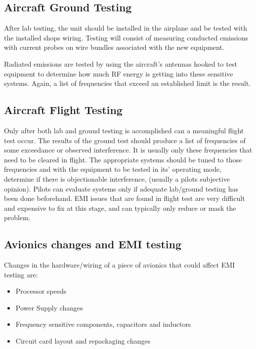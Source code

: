 \documentclass[
]{book}
\providecommand{\tightlist}{%
  \setlength{\itemsep}{0pt}\setlength{\parskip}{0pt}}
\begin{document}
\hypertarget{aircraft-ground-testing}{%
\subsection{Aircraft Ground Testing}\label{aircraft-ground-testing}}

After lab testing, the unit should be installed in the airplane and be tested
with the installed shops wiring. Testing will consist of measuring conducted
emissions with current probes on wire bundles associated with the new equipment.

Radiated emissions are tested by using the aircraft's antennas hooked to test
equipment to determine how much RF energy is getting into these sensitive
systems. Again, a list of frequencies that exceed an established limit is the
result.

\hypertarget{aircraft-flight-testing}{%
\subsection{Aircraft Flight Testing}\label{aircraft-flight-testing}}

Only after both lab and ground testing is accomplished can a meaningful flight
test occur. The results of the ground test should produce a list of frequencies
of some exceedance or observed interference. It is usually only these
frequencies that need to be cleared in flight. The appropriate systems should be
tuned to those frequencies and with the equipment to be tested in its' operating
mode, determine if there is objectionable interference, (usually a pilots
subjective opinion). Pilots can evaluate systems only if adequate lab/ground
testing has been done beforehand. EMI issues that are found in flight test are
very difficult and expensive to fix at this stage, and can typically only reduce
or mask the problem.

\hypertarget{avionics-changes-and-emi-testing}{%
\subsection{Avionics changes and EMI testing}\label{avionics-changes-and-emi-testing}}

Changes in the hardware/wiring of a piece of avionics that could affect EMI
testing are:

\begin{itemize}
\tightlist
\item
  Processor speeds
\item
  Power Supply changes
\item
  Frequency sensitive components, capacitors and inductors
\item
  Circuit card layout and repackaging changes
\end{itemize}
\end{document}
